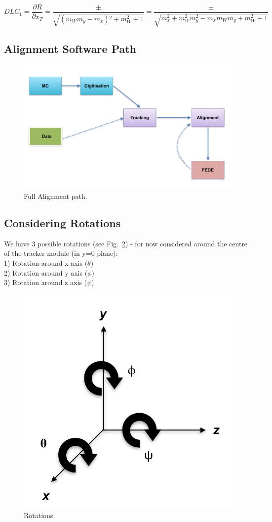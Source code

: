 \documentclass[a4paper,11pt]{article}
\begin{document}
\begin{equation}
DLC_1 = \frac{\partial R}{\partial x_T} =   \frac{\pm}{\sqrt{\left(m_W m_y-m_x\right){}^2+m_W^2+1}} = \frac{\pm}{\sqrt{m_x^2 + m_W^2 m_y^2 - m_x m_W m_y + m_W^2 + 1}} 
\end{equation}

\subsection{Alignment Software Path}

\begin{figure}[!ht]
\centering
\includegraphics[width=0.8\linewidth]{fig/AlignPath.png}
\caption{Full Alignment path.}
\label{fig:AlignPath}
\end{figure}


\clearpage
\subsection{Considering Rotations}

We have 3 possible rotations (see Fig.~\ref{fig:Rotation}) - for now considered around the centre of the tracker module (in y=0 plane): \\
1) Rotation around x axis ($\theta$) \\
2) Rotation around y axis ($\phi$) \\
3) Rotation around z axis ($\psi$) \\

\begin{figure}[!ht]
\centering
\includegraphics[width=0.4\linewidth]{fig/rotAxis.png}
\caption{Rotations}
\label{fig:Rotation}
\end{figure}
\end{document}
